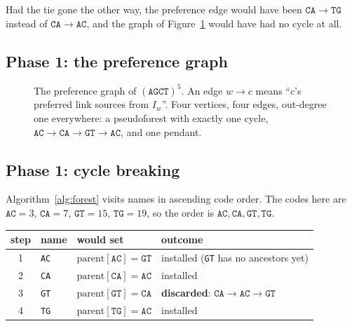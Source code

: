 \documentclass[11pt,a4paper]{article}
\theoremstyle{definition}
\theoremstyle{plain}
\theoremstyle{remark}
\begin{document}
Had the tie gone the other way, the preference edge would have been
$\mathtt{CA} \to \mathtt{TG}$ instead of
$\mathtt{CA} \to \mathtt{AC}$, and the graph of
Figure~\ref{fig:prefgraph} would have had no cycle at all.

\subsection{Phase 1: the preference graph}

\begin{figure}[h]
\centering
{}
\caption{The preference graph of $(\mathtt{AGCT})^5$. An edge
  $w \to c$ means ``$c$'s preferred link sources from $I_w$''. Four
  vertices, four edges, out-degree one everywhere: a pseudoforest with
  exactly one cycle, $\mathtt{AC} \to \mathtt{CA} \to \mathtt{GT} \to
  \mathtt{AC}$, and one pendant.}
\label{fig:prefgraph}
\end{figure}

\subsection{Phase 1: cycle breaking}

Algorithm~\ref{alg:forest} visits names in ascending code order. The
codes here are $\mathtt{AC} = 3$, $\mathtt{CA} = 7$, $\mathtt{GT} = 15$,
$\mathtt{TG} = 19$, so the order is
$\mathtt{AC}, \mathtt{CA}, \mathtt{GT}, \mathtt{TG}$.

\begin{center}
\begin{tabular}{clll}
\toprule
step & name & would set & outcome \\
\midrule
1 & \texttt{AC} & $\mathrm{parent}[\mathtt{AC}] = \mathtt{GT}$ &
  installed (\texttt{GT} has no ancestors yet) \\
2 & \texttt{CA} & $\mathrm{parent}[\mathtt{CA}] = \mathtt{AC}$ &
  installed \\
3 & \texttt{GT} & $\mathrm{parent}[\mathtt{GT}] = \mathtt{CA}$ &
  \textbf{discarded}: $\mathtt{CA} \to \mathtt{AC} \to \mathtt{GT}$ \\
4 & \texttt{TG} & $\mathrm{parent}[\mathtt{TG}] = \mathtt{AC}$ &
  installed \\
\bottomrule
\end{tabular}
\end{center}
\end{document}
